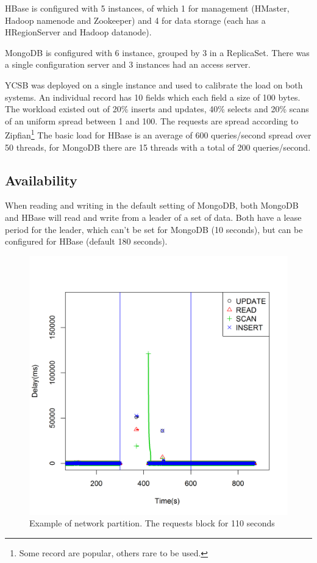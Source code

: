 \documentclass[final,5p,times]{elsarticle}
\begin{document}
HBase is configured with 5 instances, of which 1 for management (HMaster, Hadoop namenode and Zookeeper) and 4 for data storage (each has a HRegionServer and Hadoop datanode). 

MongoDB is configured with 6 instance, grouped by 3 in a ReplicaSet. There was a single configuration server and 3 instances had an access server. 

YCSB was deployed on a single instance and used to calibrate the load on both systems. An individual record has 10 fields which each field a size of 100 bytes. The workload existed out of 20\% inserts and updates, 40\% selects and 20\% scans of an uniform spread between 1 and 100. The requests are spread according to Zipfian\footnote{Some record are popular, others rare to be used.}  The basic load for HBase is an average of 600 queries/second spread over 50 threads, for MongoDB there are 15 threads with a total of 200 queries/second. 

\subsection{Availability}
When reading and writing in the default setting of MongoDB, both MongoDB and HBase will read and write from a leader of a set of data. Both have a lease period for the leader, which can't be set for MongoDB (10 seconds), but can be configured for HBase (default 180 seconds). 

\begin{figure}[h]
\centering
\includegraphics[width=\linewidth]{img/HBase/single-graph-2-drop-1}
\caption{Example of network partition. The requests block for 110 seconds }
\end{figure}
\end{document}
